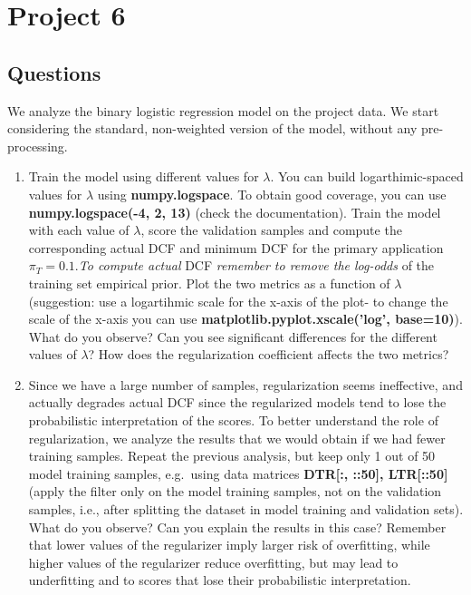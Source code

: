 \documentclass[a4paper, 12pt, english]{article}
\begin{document}
    \newpage


    \section{Project 6}

    \subsection{Questions}
    We analyze the binary logistic regression model on the project data. We start considering the standard, non-weighted version of the model, without any pre-processing.
    \begin{enumerate}
        \item Train the model using different values for \(\lambda\). You can build logarthimic-spaced values for \(\lambda\) using \textbf{numpy.logspace}. To obtain good coverage, you can use \textbf{numpy.logspace(-4, 2, 13)} (check the documentation). Train the model with each value of \(\lambda\), score the validation samples and compute the corresponding actual DCF and minimum DCF for the primary application \(\pi_T = 0.1\).\@ \textit{To compute actual} DCF \textit{remember to remove the log-odds} of the training set empirical prior. Plot the two metrics as a function of \(\lambda\) (suggestion: use a logartihmic scale for the x-axis of the plot- to change the scale of the x-axis you can use \textbf{matplotlib.pyplot.xscale('log', base=10)}). What do you observe? Can you see significant differences for the different values of \(\lambda\)? How does the regularization coefficient affects the two metrics?
        \item Since we have a large number of samples, regularization seems ineffective, and actually degrades actual DCF since the regularized models tend to lose the probabilistic interpretation of the scores. To better understand the role of regularization, we analyze the results that we would obtain if we had fewer training samples. Repeat the previous analysis, but keep only 1 out of 50 model training samples, e.g.\ using data matrices \textbf{DTR[:, ::50], LTR[::50]} (apply the filter only on the model training samples, not on the validation samples, i.e., after splitting the dataset in model training and validation sets). What do you observe? Can you explain the results in this case? Remember that lower values of the regularizer imply larger risk of overfitting, while higher values of the regularizer reduce overfitting, but may lead to underfitting and to scores that lose their probabilistic interpretation.

\end{enumerate}
\end{document}
